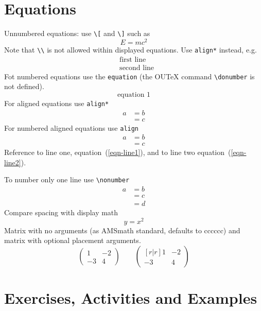 \documentclass[solutionsatend]{ouunit}
\begin{document}
\section{Equations}
Unnumbered equations: use \verb”\[” and \verb”\]” such as
\[
E=mc^2
\]
Note that \verb”\\” is not allowed within displayed equations. Use \verb"align*" instead, e.g.
\begin{align*}
&\text{first line}\\
&\text{second line}
\end{align*}
Fot numbered equations use the \verb”equation” (the OUTeX command \verb”\donumber” is not defined).
\begin{equation}
\text{equation }1
\end{equation}
For aligned equations use \verb”align*”
\begin{align*}
a& =b\\
&=c
\end{align*}
For numbered aligned equations use \verb”align”
\begin{align}
a& =b\label{eqn-line1}\\
&=c\label{eqn-line2}
\end{align}
Reference to line one, equation~(\ref{eqn-line1}), and to line two equation~(\ref{eqn-line2}).

To number only one line use \verb”\nonumber”
\begin{align}
a& =b\nonumber\\
&=c\label{eqn-middle-line}\\
&=d\nonumber
\end{align}
Compare spacing with display math
\[
y=x^2
\]
Matrix with no arguments (as AMSmath standard, defaults to cccccc) and matrix with optional placement arguments.
\[
\begin{pmatrix}
1 & -2\\
-3 & 4
\end{pmatrix}
\qquad
\begin{pmatrix}[r|r]
1 & -2\\
-3 & 4
\end{pmatrix}
\]

\section{Exercises, Activities and Examples}

\lipsum[133]

\lipsum[134]
\end{document}
